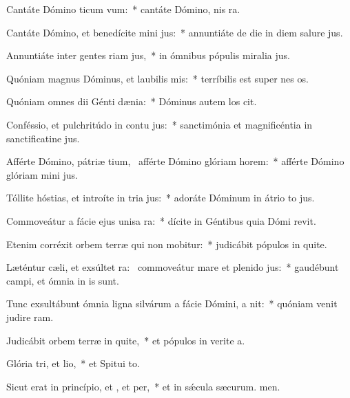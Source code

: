 \item Cantáte Dómino ticum vum:~* cantáte Dómino, nis ra.
\item Cantáte Dómino, et benedícite mini jus:~* annuntiáte de die in diem salure jus.
\item Annuntiáte inter gentes riam jus,~* in ómnibus pópulis miralia jus.
\item Quóniam magnus Dóminus, et laubilis mis:~* terríbilis est super nes os.
\item Quóniam omnes dii Génti dænia:~* Dóminus autem los cit.
\item Conféssio, et pulchritúdo in contu jus:~* sanctimónia et magnificéntia in sanctificatine jus.
\item Afférte Dómino, pátriæ tium,~\pscross{} afférte Dómino glóriam  horem:~* afférte Dómino glóriam mini jus.
\item Tóllite hóstias, et introíte in tria jus:~* adoráte Dóminum in átrio to jus.
\item Commoveátur a fácie ejus unisa ra:~* dícite in Géntibus quia Dómi revit.
\item Etenim corréxit orbem terræ qui non mobitur:~* judicábit pópulos in quite.
\item Læténtur cæli, et exsúltet ra:~\pscross{} commoveátur mare et plenido jus:~* gaudébunt campi, et ómnia  in is sunt.
\item Tunc exsultábunt ómnia ligna silvárum a fácie Dómini, a nit:~* quóniam venit judire ram.
\item Judicábit orbem terræ in quite,~* et pópulos in verite a.
\item Glória tri, et lio,~* et Spitui to.
\item Sicut erat in princípio, et , et per,~* et in sǽcula sæcurum. men.
